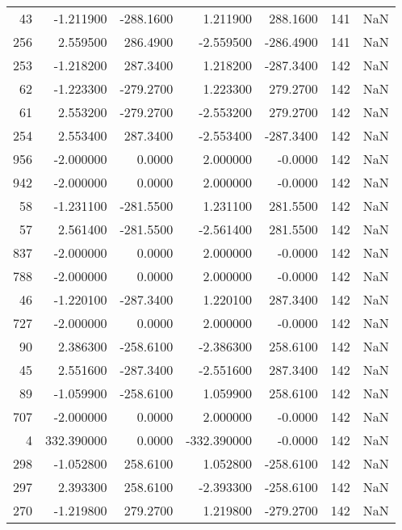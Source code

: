 \begin{tabular}{rrrrrrr}
  43 &   -1.211900 & -288.1600 &    1.211900 &    288.1600 &         141 & NaN \\
 256 &    2.559500 &  286.4900 &   -2.559500 &   -286.4900 &         141 & NaN \\
 253 &   -1.218200 &  287.3400 &    1.218200 &   -287.3400 &         142 & NaN \\
  62 &   -1.223300 & -279.2700 &    1.223300 &    279.2700 &         142 & NaN \\
  61 &    2.553200 & -279.2700 &   -2.553200 &    279.2700 &         142 & NaN \\
 254 &    2.553400 &  287.3400 &   -2.553400 &   -287.3400 &         142 & NaN \\
 956 &   -2.000000 &    0.0000 &    2.000000 &     -0.0000 &         142 & NaN \\
 942 &   -2.000000 &    0.0000 &    2.000000 &     -0.0000 &         142 & NaN \\
  58 &   -1.231100 & -281.5500 &    1.231100 &    281.5500 &         142 & NaN \\
  57 &    2.561400 & -281.5500 &   -2.561400 &    281.5500 &         142 & NaN \\
 837 &   -2.000000 &    0.0000 &    2.000000 &     -0.0000 &         142 & NaN \\
 788 &   -2.000000 &    0.0000 &    2.000000 &     -0.0000 &         142 & NaN \\
  46 &   -1.220100 & -287.3400 &    1.220100 &    287.3400 &         142 & NaN \\
 727 &   -2.000000 &    0.0000 &    2.000000 &     -0.0000 &         142 & NaN \\
  90 &    2.386300 & -258.6100 &   -2.386300 &    258.6100 &         142 & NaN \\
  45 &    2.551600 & -287.3400 &   -2.551600 &    287.3400 &         142 & NaN \\
  89 &   -1.059900 & -258.6100 &    1.059900 &    258.6100 &         142 & NaN \\
 707 &   -2.000000 &    0.0000 &    2.000000 &     -0.0000 &         142 & NaN \\
   4 &  332.390000 &    0.0000 & -332.390000 &     -0.0000 &         142 & NaN \\
 298 &   -1.052800 &  258.6100 &    1.052800 &   -258.6100 &         142 & NaN \\
 297 &    2.393300 &  258.6100 &   -2.393300 &   -258.6100 &         142 & NaN \\
 270 &   -1.219800 &  279.2700 &    1.219800 &   -279.2700 &         142 & NaN \\

\end{tabular}
